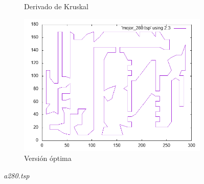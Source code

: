 \documentclass[12pt,spanish]{article}
\begin{document}
\begin{figure}[H]
\begin{subfigure}[b]{0.36\textwidth}
\caption{Derivado de Kruskal}
\end{subfigure}
\quad
\begin{subfigure}[b]{0.36\textwidth}
\includegraphics[width=\textwidth]{a280_mejor.png}
\caption{Versión óptima}
\end{subfigure}
\caption{\textit{a280.tsp}}
\end{figure}
\end{document}

